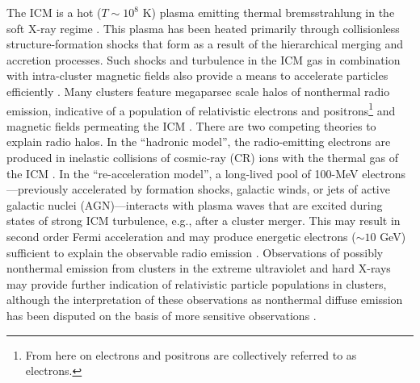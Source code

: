 \documentclass[12pt,manuscript]{aastex}
\begin{document}
The ICM is a hot ($T\sim 10^{8}$ K) plasma emitting thermal bremsstrahlung in the soft X-ray regime
\citep[see, e.g.,][]{article:Petrosian:2001}. This plasma has been heated primarily through
collisionless structure-formation shocks that form as a result of the hierarchical merging and
accretion processes. Such shocks and turbulence in the ICM gas in combination with intra-cluster
magnetic fields also provide a means to accelerate particles efficiently \citep[see,
e.g.,][]{article:ColafrancescoBlasi:1998, article:Ryu_etal:2003}. Many clusters feature megaparsec
scale halos of nonthermal radio emission, indicative of a population of relativistic electrons and
positrons\footnote{From here on electrons and positrons are collectively referred to as electrons.}
and magnetic fields permeating the ICM \citep{article:Cassano_etal:2010}. There are two competing
theories to explain radio halos. In the ``hadronic model'', the radio-emitting
electrons are produced in inelastic collisions of cosmic-ray (CR) ions with the thermal gas of the
ICM \citep{article:Dennison:1980, article:EnsslinPfrommerMiniatiSubramanian:2011}. In the
``re-acceleration model'', a long-lived pool of 100-MeV electrons---previously accelerated by
formation shocks, galactic winds, or jets of active galactic nuclei (AGN)---interacts with plasma
waves that are excited during states of strong ICM turbulence, e.g., after a cluster merger. This
may result in second order Fermi acceleration and may produce energetic electrons ($\sim 10$ GeV)
sufficient to explain the observable radio emission \citep{article:SchlickeiserSieversThiemann:1987,
article:BrunettiLazarian:2010}. Observations of possibly nonthermal emission from clusters
in the extreme ultraviolet \citep[EUV; ][]{article:SarazinLieu:1998} and hard X-rays
\citep{article:RephaeliGruber:2002, article:Fusco-Femiano_etal:2004, article:Eckert_etal:2007} may
provide further indication of relativistic particle populations in clusters, although the
interpretation of these observations as nonthermal diffuse emission has been disputed on the basis
of more sensitive observations \citep[see, e.g.,][]{article:Ajello_etal:2009,
article:Ajello_etal:2010, article:Wik_etal:2009}.
\end{document}
